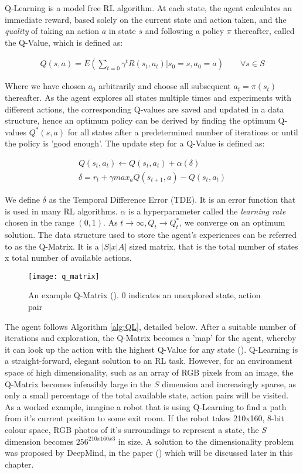 Q-Learning is a model free RL algorithm. At each state, the agent calculates an immediate reward,
based solely on the current state and action taken, and the \textit{quality} of taking an action $a$
in state $s$ and following a policy $\pi$ thereafter, called the Q-Value, which is defined as:

\begin{align}
    \label{equ:Q}
    Q(s, a) = E(\sum_{t=0}\gamma^tR(s_t, a_t) | s_0 = s, a_0 = a) \qquad \forall s \in S
\end{align}

Where we have chosen $a_0$ arbitrarily and
choose all subsequent $a_t = \pi(s_t)$ thereafter. As the agent explores all states multiple times
and experiments with different actions, the corresponding Q-values are saved and updated in a data
structure, hence an optimum policy can be derived by finding the optimum Q-values $Q^*(s, a)$ for all states after a predetermined number of iterations or until the policy is 'good enough'. The update step for a Q-Value is defined as:

\begin{gather}
    \label{equ:QUpdate}
    Q(s_t, a_t) \leftarrow Q(s_t, a_t) + \alpha(\delta) \\
    \label{equ:TDE}
    \delta = r_t + \gamma max_aQ(s_{t+1}, a) - Q(s_t, a_t)
\end{gather}

We define $\delta$ as the Temporal Difference Error (TDE). It is an error function that is used in many RL algorithms. $\alpha$ is a hyperparameter called the \textit{learning rate} chosen in the range $(0, 1)$. As $t \rightarrow \infty, Q_t \rightarrow Q^*_t$, we converge on an optimum solution. The data structure used to store the agent's experiences can be referred to as the Q-Matrix. It is a $|S| x |A|$ sized matrix, that is the total number of states x total number of available actions.

\begin{figure}[h]
    \texttt{[image: q\_matrix]}
    \centering
    \caption{An example Q-Matrix (\citet{qmatrix}). 0 indicates an unexplored state, action pair}
\end{figure}

The agent follows Algorithm \ref{alg:QL}, detailed below.
After a suitable number of iterations and exploration, the Q-Matrix becomes a 'map' for the agent,
whereby it can look up the action with the highest Q-Value for any state (\citet{qlearning}).
Q-Learning is a straight-forward, elegant solution to an RL task. However, for an environment space
of high dimensionality, such as an array of RGB pixels from an image, the Q-Matrix becomes
infeasibly large in the $S$ dimension and increasingly sparse, as only a small percentage of the
total available state, action pairs will be visited. As a worked example, imagine a robot that is
using Q-Learning to find a path from it's current position to some exit room. If the robot takes
210x160, 8-bit colour space, RGB photos of it's surroundings to represent a state, the $S$ dimension
becomes $256^{210x160x3}$ in size. A solution to the dimensionality problem was
proposed by DeepMind, in the paper (\citet{deepmind1}) which will be discussed later in this chapter.


